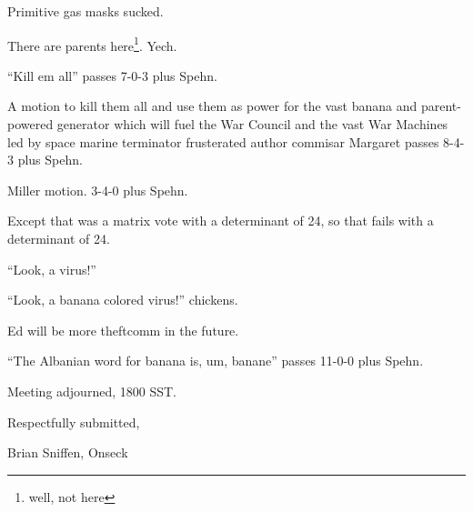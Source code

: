 \documentclass[10pt]{article}
\newcommand{\ps}{ plus Spehn\xspace}
\begin{document}
Primitive gas masks sucked.

There are parents here\footnote{well, not here}.  Yech.

``Kill em all'' passes 7-0-3\ps.

A motion to kill them all and use them as power for the vast banana
and parent-powered generator which will fuel the War Council and the
vast War Machines led by space marine terminator frusterated author
commisar Margaret passes 8-4-3\ps.

Miller motion. 3-4-0\ps.

Except that was a matrix vote with a determinant of 24, so that fails
with a determinant of 24.

``Look, a virus!'' 

``Look, a banana colored virus!'' chickens.

Ed will be more theftcomm in the future.

``The Albanian word for banana is, um, banane'' passes 11-0-0\ps.

\vspace{12pt}

\noindent
Meeting adjourned, 1800 SST.

\vspace{18pt}

\centerline{Respectfully submitted,}
\centerline{Brian Sniffen, Onseck}
\end{document}
